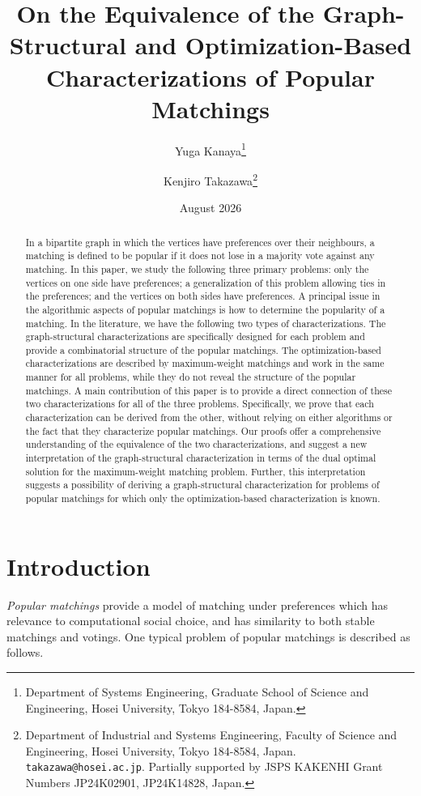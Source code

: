 \documentclass[11pt,a4paper,showkeys]{article}
\title{On the Equivalence of the Graph-Structural and Optimization-Based Characterizations of Popular Matchings}
\author{
Yuga Kanaya\thanks{Department of Systems Engineering, Graduate School of Science and Engineering, Hosei University, Tokyo 184-8584, Japan.}
\and 
Kenjiro Takazawa\thanks{Department of Industrial and Systems Engineering, Faculty of Science and Engineering, 
Hosei University, Tokyo 184-8584, Japan.  
\texttt{takazawa@hosei.ac.jp}.  
Partially supported by 
JSPS KAKENHI Grant Numbers 
JP24K02901, JP24K14828, 
Japan.
}}
\date{August 2026}
\theoremstyle{plain}
\theoremstyle{definition}
\begin{document}
\maketitle


\begin{abstract}
In a bipartite graph in which the vertices have preferences over their neighbours, a matching is defined to be popular if it does not lose in a majority vote against any matching. In this paper, we study the following three primary problems: only the vertices on one side have preferences; a generalization of this problem allowing ties in the preferences; and the vertices on both sides have preferences. 
A principal issue in the algorithmic aspects of popular matchings is how to determine the popularity of a matching. 
In the literature, we have the following two types of characterizations. 
The graph-structural characterizations are specifically designed for each problem and provide a combinatorial structure of the popular matchings. The optimization-based characterizations are described by maximum-weight matchings and work in the same manner for all problems, while they do not reveal the structure of the popular matchings. 
A main contribution of this paper is to provide a direct connection of these two characterizations for all of the three problems. Specifically, we prove that each characterization can be derived from the other, without relying on either algorithms or the fact that they characterize popular matchings. Our proofs offer a comprehensive understanding of the equivalence of the two characterizations, and suggest a new interpretation of the graph-structural characterization in terms of the dual optimal solution for the maximum-weight matching problem. Further, this interpretation suggests a possibility of deriving a graph-structural characterization for problems of popular matchings for which only the optimization-based characterization is known. 
\end{abstract}



\section{Introduction}

\label{SECintro}

\emph{Popular matchings} \cite{Gar75} provide a model of matching under preferences \cite{Man13} which has relevance to computational social choice, 
and  has similarity to both stable matchings and votings. 
One typical problem of popular matchings is described as follows. 
\end{document}
